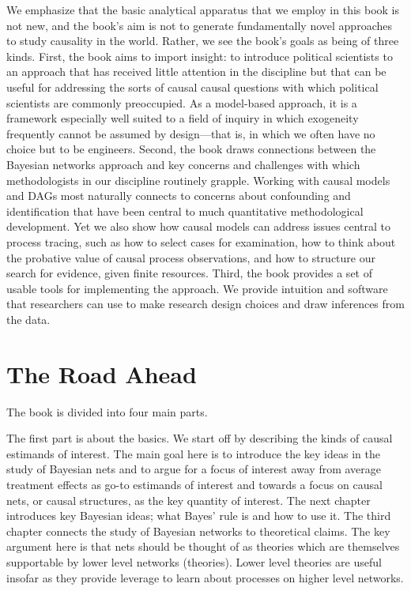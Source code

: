 \documentclass[12pt,]{book}
\begin{document}
We emphasize that the basic analytical apparatus that we employ in this book is not new, and the book's aim is not to generate fundamentally novel approaches to study causality in the world. Rather, we see the book's goals as being of three kinds. First, the book aims to import insight: to introduce political scientists to an approach that has received little attention in the discipline but that can be useful for addressing the sorts of causal causal questions with which political scientists are commonly preoccupied. As a model-based approach, it is a framework especially well suited to a field of inquiry in which exogeneity frequently cannot be assumed by design---that is, in which we often have no choice but to be engineers. Second, the book draws connections between the Bayesian networks approach and key concerns and challenges with which methodologists in our discipline routinely grapple. Working with causal models and DAGs most naturally connects to concerns about confounding and identification that have been central to much quantitative methodological development. Yet we also show how causal models can address issues central to process tracing, such as how to select cases for examination, how to think about the probative value of causal process observations, and how to structure our search for evidence, given finite resources. Third, the book provides a set of usable tools for implementing the approach. We provide intuition and software that researchers can use to make research design choices and draw inferences from the data.

\hypertarget{the-road-ahead}{%
\section{The Road Ahead}\label{the-road-ahead}}

The book is divided into four main parts.

The first part is about the basics. We start off by describing the kinds of causal estimands of interest. The main goal here is to introduce the key ideas in the study of Bayesian nets and to argue for a focus of interest away from average treatment effects as go-to estimands of interest and towards a focus on causal nets, or causal structures, as the key quantity of interest. The next chapter introduces key Bayesian ideas; what Bayes' rule is and how to use it. The third chapter connects the study of Bayesian networks to theoretical claims. The key argument here is that nets should be thought of as theories which are themselves supportable by lower level networks (theories). Lower level theories are useful insofar as they provide leverage to learn about processes on higher level networks.
\end{document}
